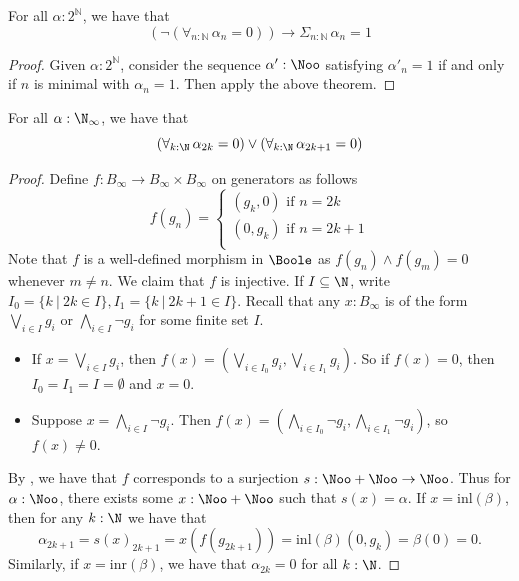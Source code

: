 \begin{corollary}\label{MarkovPrinciple}
  For all $\alpha:2^\mathbb N$, we have that 
  \[
    (\neg (\forall_{n:\mathbb N}\, \alpha_n= 0)) \to \Sigma_{n:\mathbb N}\, \alpha_n= 1
  \]
\end{corollary}
\begin{proof}
  Given $\alpha:2^\mathbb N$, consider the sequence $\alpha':\Noo$ satisfying $\alpha'_n = 1$ if and only if
  $n$ is minimal with $\alpha_n = 1$. Then apply the above theorem.
\end{proof}

\begin{theorem}\label{LLPO}
  For all $\alpha:\N_\infty$, 
  we have that
  \[\label{eqnLLPO}
    (\forall_{k:\N}\, \alpha_{2k} = 0)  \vee (\forall_{k:\N}\, \alpha_{2k+1} = 0)
  \]
\end{theorem}
\begin{proof}
  Define $f:B_\infty \to B_\infty \times B_\infty$ on generators as follows
  \[\label{eqnLLPOProofMap}
    f(g_n) =\begin{cases}
      (g_k,0) \text{ if } n = 2k\\
      (0,g_k) \text{ if } n = 2k+1\\
    \end{cases}
  \]
  Note that $f$ is a well-defined morphism in $\Boole$ as 
  $f(g_n) \wedge f(g_m) = 0$ whenever $m\neq n$. 
  We claim that $f$ is injective. 
  If $I\subseteq \N$, write 
  $ I_0 =\{k\ |\ 2k \in I\}, 
    I_1 =\{k\ |\ 2k+1 \in I\}
  $.
  Recall that any $x:B_\infty$ is of the form 
  $\bigvee_{i\in I} g_i$ or $\bigwedge_{i\in I} \neg g_i$ for some finite set $I$. 
  \begin{itemize}
    \item If $x = \bigvee_{i\in I} g_i$, then 
      $f(x) = (\bigvee_{i\in I_0}g_{i}, \bigvee_{i\in I_1}g_i)$. 
      So if $f(x) = 0$, then $I_0=I_1 = I = \emptyset$ and $x = 0$. 
    \item Suppose 
      $x = \bigwedge_{i\in I} \neg g_i$.
      Then $f(x) = (\bigwedge_{i\in I_0} \neg g_i, \bigwedge_{i\in I_1} \neg g_i)$, 
      so $f(x) \neq 0$. 
  \end{itemize}
  By ,
  we have that $f$ corresponds to a surjection 
  $s:\Noo + \Noo \to \Noo$.
  Thus for $\alpha : \Noo$, 
  there exists some $x:\Noo + \Noo$ such that $s(x) = \alpha$. 
  If $x = \mathrm{inl}(\beta)$, 
  then for any $k:\N$ we have that 
\[\alpha_{2k+1} = s(x)_{2k+1} = x(f(g_{2k+1})) = \mathrm{inl}(\beta) (0,g_k)  = \beta(0) = 0.\]
  Similarly, if $x = \mathrm{inr}(\beta)$, we have that $\alpha_{2k} = 0$ for all $k:\N$. 
\end{proof}
